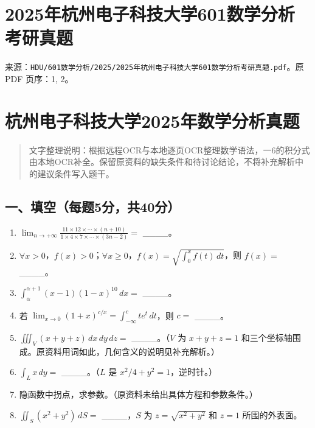 \documentclass[11pt,fontset=fandol]{ctexart}
\begin{document}
\section{2025年杭州电子科技大学601数学分析考研真题}\label{ux5e74ux676dux5ddeux7535ux5b50ux79d1ux6280ux5927ux5b66601ux6570ux5b66ux5206ux6790ux8003ux7814ux771fux9898}

来源：\texttt{HDU/601数学分析/2025/2025年杭州电子科技大学601数学分析考研真题.pdf}。原
PDF 页序：1, 2。

\section{杭州电子科技大学2025年数学分析真题}\label{ux676dux5ddeux7535ux5b50ux79d1ux6280ux5927ux5b662025ux5e74ux6570ux5b66ux5206ux6790ux771fux9898}

\begin{quote}
文字整理说明：根据远程OCR与本地逐页OCR整理数学语法，一6的积分式由本地OCR补全。保留原资料的缺失条件和待讨论结论，不将补充解析中的建议条件写入题干。
\end{quote}

\subsection{一、填空（每题5分，共40分）}\label{ux4e00ux586bux7a7aux6bcfux98985ux5206ux517140ux5206}

\begin{enumerate}
\def\labelenumi{\arabic{enumi}.}
\item
  \(\displaystyle\lim_{n\to+\infty}\frac{11\times12\times\cdots\times(n+10)}{1\times4\times7\times\cdots\times(3n-2)}=\)
  \_\_\_\_。
\item
  \(\forall x>0\)，\(f(x)>0\)；\(\forall x\ge0\)，\(\displaystyle f(x)=\sqrt{\int_0^xf(t)\,dt}\)，则
  \(f(x)=\) \_\_\_\_。
\item
  \(\displaystyle\int_\alpha^{\alpha+1}(x-1)(1-x)^{10}\,dx=\) \_\_\_\_。
\item
  若
  \(\displaystyle\lim_{x\to0}(1+x)^{c/x}=\int_{-\infty}^cte^t\,dt\)，则
  \(c=\) \_\_\_\_。
\item
  \(\displaystyle\iiint_V(x+y+z)\,dx\,dy\,dz=\) \_\_\_\_。（\(V\) 为
  \(x+y+z=1\)
  和三个坐标轴围成。原资料用词如此，几何含义的说明见补充解析。）
\item
  \(\displaystyle\int_Lx\,dy=\) \_\_\_\_。（\(L\) 是
  \(x^2/4+y^2=1\)，逆时针。）
\item
  隐函数中拐点，求参数。（原资料未给出具体方程和参数条件。）
\item
  \(\displaystyle\iint_S(x^2+y^2)\,dS=\) \_\_\_\_，\(S\) 为
  \(z=\sqrt{x^2+y^2}\) 和 \(z=1\) 所围的外表面。
\end{enumerate}
\end{document}
